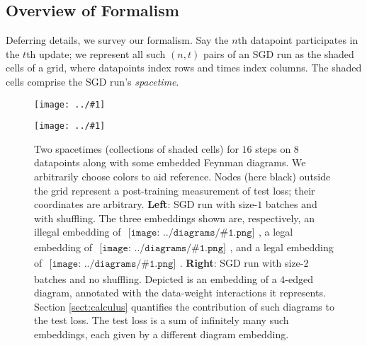\documentclass{article}
\theoremstyle{plain}
\theoremstyle{definition}
\newcommand{\plotmooh}[3]{
    \texttt{[image: ../\#1]}
}
\newcommand{\sdia}[1]{\begin{gathered}\texttt{[image: ../diagrams/\#1.png]}\end{gathered}}
\begin{document}
    \subsection{Overview of Formalism}


            Deferring details, we survey our formalism.  Say the $n$th
            datapoint participates in the $t$th update; we represent all such
            $(n, t)$ pairs of an SGD run as the shaded cells of a grid, where
            datapoints index rows and times index columns.  The shaded cells
            comprise the SGD run's \emph{spacetime}.
            \begin{figure}[H] 
                \centering  
                \plotmooh{diagrams/spacetime-e}{}{0.265\columnwidth}
                \plotmooh{diagrams/spacetime-f}{}{0.265\columnwidth}
                \caption{
                    Two spacetimes (collections of shaded cells) for $16$ steps
                    on $8$ datapoints along with some embedded Feynman
                    diagrams.  We arbitrarily choose colors to aid reference. 
                    Nodes (here black) outside the grid represent a
                    post-training measurement of test loss; their coordinates
                    are arbitrary.
                    {\bf Left}: SGD run with size-$1$ batches and with
                        shuffling.  The three embeddings shown are,
                        respectively, an illegal embedding of
                        $\sdia{(01-2)(01-12)}$, a legal embedding of
                        $\sdia{(01-2)(01-12)}$, and a legal embedding of
                        $\sdia{(0-1-2)(01-12)}$.
                    {\bf Right}: SGD run with size-$2$ batches and no
                        shuffling.  Depicted is an embedding of a $4$-edged
                        diagram, annotated with the data-weight interactions it
                        represents.  Section \ref{sect:calculus} quantifies the
                        contribution of such diagrams to the test loss.  The
                        test loss is a sum of infinitely many such embeddings,
                        each given by a different diagram embedding.  
                }
                \label{fig:spacetimes}
            \end{figure}
\end{document}
